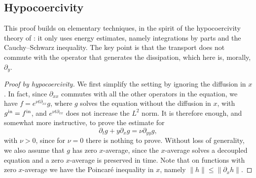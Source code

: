 \documentclass[11pt]{article}
\theoremstyle{definition}
\theoremstyle{remark}
\begin{document}
\subsection{Hypocoercivity}
This proof builds on elementary techniques, in the spirit of the hypocoercivity theory of \citet{Villani2009}: it only uses energy estimates, namely integrations by parts and the Cauchy–Schwarz inequality. The key point is that the transport does not commute with the operator that generates the dissipation, which here is, morally, $\partial_y$.
\begin{proof}[Proof by hypocoercivity]\label{proof-couette-hypocoercivity}
We first simplify the setting by ignoring the diffusion in $x$. In fact, since $\partial_{xx}$ commutes with all the other operators in the equation, we have $f=e^{\nu t\partial_{xx}}g$, where $g$ solves the equation without the diffusion in $x$, with $g^{\rm in}=f^{\rm in}$, and $e^{\nu t\partial_{xx}}$ does not increase the $L^2$ norm. It is therefore enough, and somewhat more instructive, to prove the estimate for
\[\partial_tg+y\partial_xg=\nu\partial_{yy}g,\]
with $\nu>0$, since for $\nu=0$ there is nothing to prove. Without loss of generality, we also assume that $g$ has zero $x$-average, since the $x$-average solves a decoupled equation and a zero $x$-average is preserved in time. Note that on functions with zero $x$-average we have the Poincaré inequality in $x$, namely $\|h\|\leq\|\partial_xh\|$.


\end{proof}
\end{document}
